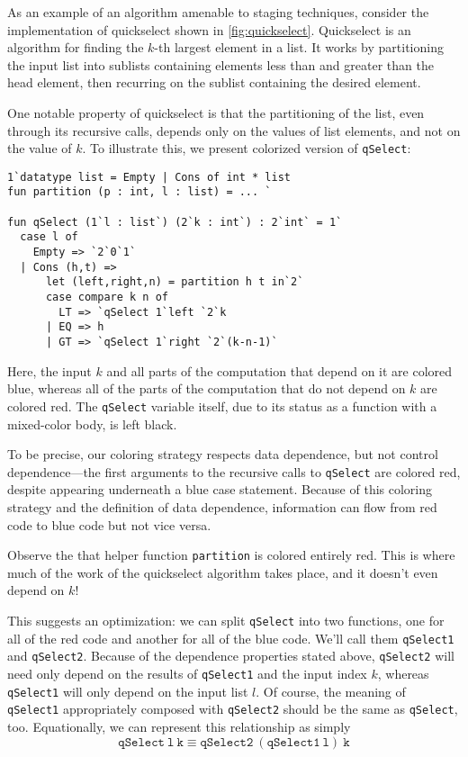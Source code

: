 As an example of an algorithm amenable to staging techniques,
consider the implementation of quickselect shown in \ref{fig:quickselect}.
Quickselect is an algorithm for finding the $k$-th largest element in a list.
It works by partitioning the input list into sublists containing elements less than and greater than the head element, 
then recurring on the sublist containing the desired element.

One notable property of quickselect is that the partitioning of the list, 
even through its recursive calls, depends only on the values of list elements, and not on the value of $k$.
To illustrate this, we present colorized version of \texttt{qSelect}:

\begin{lstlisting} 
1`datatype list = Empty | Cons of int * list
fun partition (p : int, l : list) = ... `

fun qSelect (1`l : list`) (2`k : int`) : 2`int` = 1`
  case l of
    Empty => `2`0`1`
  | Cons (h,t) => 
      let (left,right,n) = partition h t in`2`
      case compare k n of
        LT => `qSelect 1`left `2`k
      | EQ => h
      | GT => `qSelect 1`right `2`(k-n-1)`
\end{lstlisting}

Here, the input $k$ and all parts of the computation that depend on it are colored blue,
whereas all of the parts of the computation that do not depend on $k$ are colored red.
The \texttt{qSelect} variable itself, due to its status as a function with a mixed-color body, is left black.

To be precise, our coloring strategy respects data dependence, but not control dependence---the 
first arguments to the recursive calls to \texttt{qSelect} are colored red,
despite appearing underneath a blue case statement.
Because of this coloring strategy and the definition of data dependence, 
information can flow from red code to blue code but not vice versa.

Observe the that helper function \texttt{partition} is colored entirely red.
This is where much of the work of the quickselect algorithm takes place, and it doesn't even depend on $k$!

This suggests an optimization: we can split \texttt{qSelect} into two functions, 
one for all of the red code and another for all of the blue code. 
We'll call them \texttt{qSelect1} and \texttt{qSelect2}.
Because of the dependence properties stated above, 
\texttt{qSelect2} will need only depend on the results of \texttt{qSelect1} and the input index $k$,
whereas \texttt{qSelect1} will only depend on the input list $l$.
Of course, the meaning of \texttt{qSelect1} appropriately composed with \texttt{qSelect2} should be the same as \texttt{qSelect}, too.
Equationally, we can represent this relationship as simply 
\[
\mathtt{qSelect~l~k} \equiv \mathtt{qSelect2~(qSelect1~l)~k}
\]

